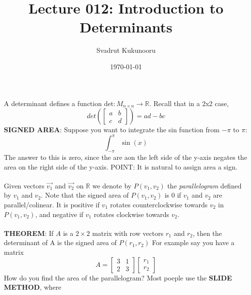 \documentclass[letterpaper]{report}
\title{Lecture 012: Introduction to Determinants}
\author{Svadrut Kukunooru}
\date{\today}
\begin{document}
\begin{titlepage}
    \maketitle
\end{titlepage}
A determinant defines a function $\text{det} : M_{n\times n} \to \mathbb{R}$. Recall that in a 2x2 case, 
\[
    det\left(
    \begin{bmatrix} 
        a & b \\
        c & d
\end{bmatrix}\right)  = ad - bc
\] 
\textbf{SIGNED AREA}: Suppose you want to integrate the sin function from $-\pi$ to $\pi$: 
\[
    \int_{-\pi}^{\pi} \sin(x)
\] 
The answer to this is zero, since the are aon the left side of the y-axis negates the area on the right side of the y-axis. POINT: It is natural to assign area a sign. 
\\ \\ 
Given vectors $\vec{v_1}$ and $\vec{v_2}$ on $\mathbb{R}$ we denote by $P(v_1, v_2)$ the \textit{parallelogram} defined by $v_1$ and $v_2$. Note that the signed area of $P(v_1,v_2)$ is 0 if $v_1$ and $v_2$ are parallel/colinear. It is positive if $v_1$ rotates counterclockwise towards $v_2$ in $P(v_1, v_2)$, and negative if $v_1$ rotates clockwise towards $v_2$.  \\ \\ 
\textbf{THEOREM}: If $A$ is a $2\times 2$ matrix with row vectors $r_1$ and $r_2$, then the determinant of A is the signed area of $P(r_1,r_2)$ For example say you have a matrix 
\[
A = 
\begin{bmatrix} 
    3 & 1 \\
    2 & 3
\end{bmatrix} 
\begin{bmatrix} 
r_1 \\ r_2
\end{bmatrix} 
\] How do you find the area of the parallelogram?
Most poeple use the \textbf{SLIDE METHOD}, where 
\end{document}
